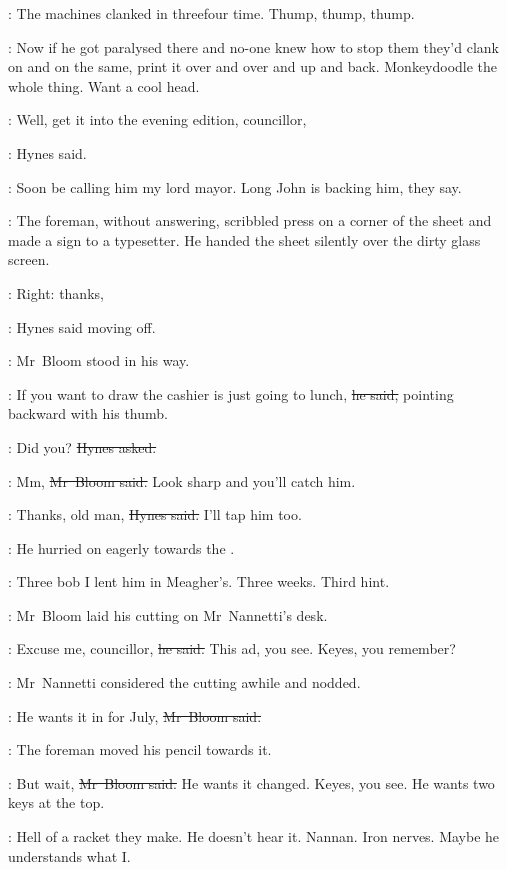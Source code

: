 :
The machines clanked in threefour time.
Thump, thump, thump.

\BloomInt:
Now if he got paralysed there
and no-one knew how to stop them
they'd clank on and on the same,
print it over and over and up and back.
Monkeydoodle the whole thing.
Want a cool head.

\hynes:
Well, get it into the evening edition, councillor,

:
Hynes said.

\BloomInt:
Soon be calling him my lord mayor.
Long John is backing him, they say.

:
The foreman, without answering,
scribbled press on a corner of the sheet
and made a sign to a typesetter.
He handed the sheet silently over the dirty glass screen.%

\hynes:
Right: thanks,

:
Hynes said moving off.

:
Mr~Bloom stood in his way.

\Bloom:
If you want to draw the cashier is just going to lunch,
\sout{he said,}
pointing backward with his thumb.

\hynes:
Did you?
\sout{Hynes asked.}

\Bloom:
Mm,
\sout{Mr~Bloom said.}
Look sharp and you'll catch him.

\hynes:
Thanks, old man,
\sout{Hynes said.}
I'll tap him too.

:
He hurried on eagerly towards the .

\BloomInt:
Three bob I lent him in Meagher's.
Three weeks.
Third hint.


%

:
Mr~Bloom laid his cutting on Mr~Nannetti's desk.

\Bloom:
Excuse me, councillor,
\sout{he said.}
This ad, you see.
Keyes, you remember?

:
Mr~Nannetti considered the cutting awhile and nodded.

\Bloom:
He wants it in for July,
\sout{Mr~Bloom said.}

:
The foreman moved his pencil towards it.

\Bloom:
But wait,
\sout{Mr~Bloom said.}
He wants it changed.
Keyes, you see.
He wants two keys at the top.

\BloomInt:
Hell of a racket they make.
He doesn't hear it.
Nannan.
Iron nerves.
Maybe he understands what I.

